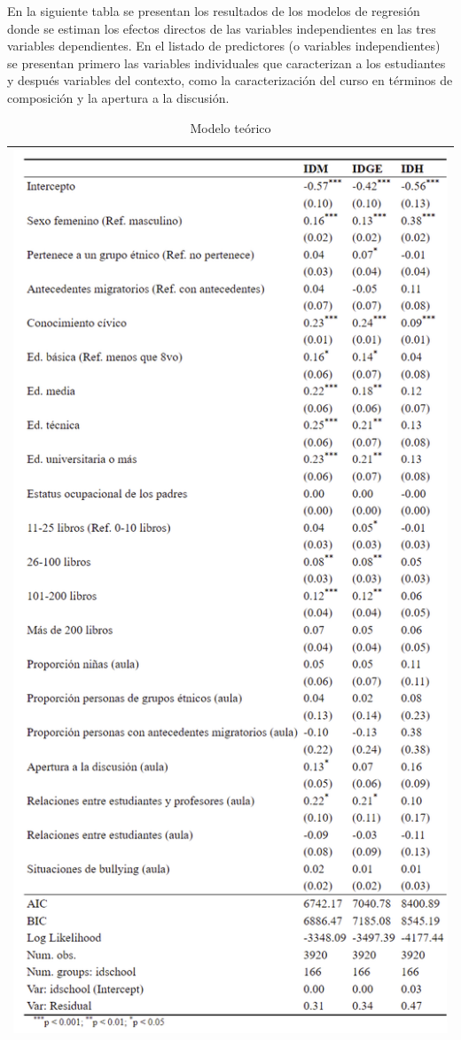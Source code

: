 \documentclass[12pt,twoside]{templates/facsothesis}
\begin{document}
En la siguiente tabla se presentan los resultados de los modelos de regresión donde se estiman los efectos directos de las variables independientes en las tres variables dependientes. En el listado de predictores (o variables independientes) se presentan primero las variables individuales que caracterizan a los estudiantes y después variables del contexto, como la caracterización del curso en términos de composición y la apertura a la discusión.

\begin{longtable}[]{@{}l@{}}
\caption{\label{tab:unnamed-chunk-9}Modelo teórico}\tabularnewline
\toprule
\endhead
\includegraphics[width=\textwidth,height=0.9\textheight]{input/images/app_mod.png} \\
\bottomrule
\end{longtable}
\end{document}
